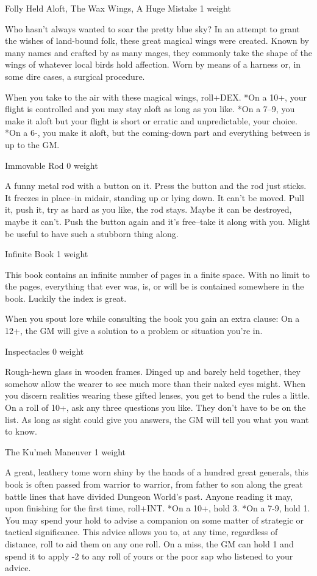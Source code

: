 Folly Held Aloft, The Wax Wings, A Huge Mistake 1 weight


 Who hasn't always wanted to soar the pretty blue sky? In an attempt to grant the wishes of land-bound folk, these great magical wings were created. Known by many names and crafted by as many mages, they commonly take the shape of the wings of whatever local birds hold affection. Worn by means of a harness or, in some dire cases, a surgical procedure.


 When you take to the air with these magical wings, roll+DEX. *On a 10+, your flight is controlled and you may stay aloft as long as you like. *On a 7--9, you make it aloft but your flight is short or erratic and unpredictable, your choice. *On a 6-, you make it aloft, but the coming-down part and everything between is up to the GM.


 Immovable Rod 0 weight


 A funny metal rod with a button on it. Press the button and the rod just sticks. It freezes in place--in midair, standing up or lying down. It can't be moved. Pull it, push it, try as hard as you like, the rod stays. Maybe it can be destroyed, maybe it can't. Push the button again and it's free--take it along with you. Might be useful to have such a stubborn thing along. 


 Infinite Book 1 weight


 This book contains an infinite number of pages in a finite space. With no limit to the pages, everything that ever was, is, or will be is contained somewhere in the book. Luckily the index is great.


 When you spout lore while consulting the book you gain an extra clause: On a 12+, the GM will give a solution to a problem or situation you're in.


 Inspectacles 0 weight


 Rough-hewn glass in wooden frames. Dinged up and barely held together, they somehow allow the wearer to see much more than their naked eyes might. When you discern realities wearing these gifted lenses, you get to bend the rules a little. On a roll of 10+, ask any three questions you like. They don't have to be on the list. As long as sight could give you answers, the GM will tell you what you want to know.


 The Ku'meh Maneuver 1 weight


 A great, leathery tome worn shiny by the hands of a hundred great generals, this book is often passed from warrior to warrior, from father to son along the great battle lines that have divided Dungeon World's past. Anyone reading it may, upon finishing for the first time, roll+INT. *On a 10+, hold 3. *On a 7-9, hold 1. You may spend your hold to advise a companion on some matter of strategic or tactical significance. This advice allows you to, at any time, regardless of distance, roll to aid them on any one roll. On a miss, the GM can hold 1 and spend it to apply -2 to any roll of yours or the poor sap who listened to your advice.


